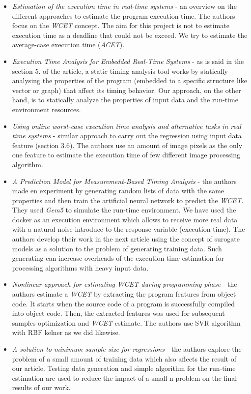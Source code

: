 \begin{itemize}
	\item \textit{Estimation of the execution time in real-time systems}\cite{wcet} - an overview on the different approaches to estimate the program execution time. The authors focus on the \textit{WCET} concept. The aim for this project is not to estimate execution time as a deadline that could not be exceed. We try to estimate the average-case execution time (\textit{ACET}).

\item \textit{Execution Time Analysis for Embedded Real-Time Systems}\cite{time-analysis} - as is said in the section 5. of the article, a static timing  analysis tool works by statically analysing the properties of the program (embedded to a specific structure like vector or graph) that affect its timing behavior. Our approach, on the other hand, is to statically analyze the properties of input data and the run-time environment resources.

\item \textit{Using online worst-case execution time analysis and alternative tasks in real time systems}\cite{images-processing-time} - similar approach to carry out the regression using input data feature (section 3.6). The authors use an amount of image pixels as the only one feature to estimate the execution time of few different image processing algorithm.

\item \textit{A Prediction Model for Measurement-Based Timing Analysis}\cite{ga} - the authors made en experiment by generating random lists of data with the same properties and then train the artificial neural network to predict the \textit{WCET}. They used \textit{Gem5} to simulate the run-time environment. We have used the docker as an execution environment which allows to receive more real data with a natural noise introduce to the response variable (execution time). The authors develop their work in the next article\cite{surogate} using the concept of surogate models as a solution to the problem of generating training data. Such generating can increase overheads of the execution time estimation for processing algorithms with heavy input data.

\item \textit{Nonlinear approach for estimating WCET during programming phase}\cite{program-features} - the authors estimate a \textit{WCET} by extracting the program features from object code. It starts when the source code of a program is successfully compiled into object code. Then, the extracted features was used for subsequent samples optimization and \textit{WCET} estimate. The authors use SVR algorithm with RBF kelner as we did likewise.

\item \textit{A solution to minimum sample size for regressions}\cite{small-n} - the authors explore the problem of a small amount of training data which also affects the result of our article. Testing data generation and simple algorithm for the run-time estimation are used to reduce the impact of a small n problem on the final results of our work.

\end{itemize}


